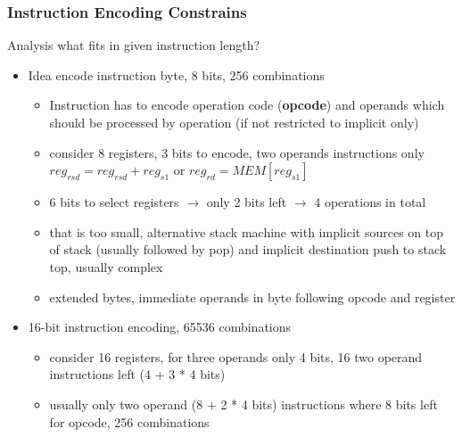 \documentclass{beamer}
\begin{document}
\begin{frame}
\frametitle{Instruction Encoding Constrains}

Analysis what fits in given instruction length?
\begin{itemize}
\item Idea encode instruction byte, 8 bits, 256 combinations
\begin{itemize}
\item Instruction has to encode operation code (\textbf{opcode}) and operands which should be processed by operation (if not restricted to implicit only)
\item consider 8 registers, 3 bits to encode, two operands instructions only \texttt{$reg_{rsd} = reg_{rsd} + reg_{s1}$} or \texttt{$reg_{rd} = MEM[reg_{s1}]$}
\item 6 bits to select registers $\to$ only 2 bits left $\to$ 4 operations in total
\item that is too small, alternative stack machine with implicit sources on top of stack (usually followed by pop) and implicit destination push to stack top, usually complex
\item extended bytes, immediate operands in byte following opcode and register
\end{itemize}
\item 16-bit instruction encoding, 65536 combinations
\begin{itemize}
\item consider 16 registers, for three operands only 4 bits, 16 two operand instructions left (4 + 3 * 4 bits)
\item usually only two operand (8 + 2 * 4 bits) instructions where 8 bits left for opcode, 256 combinations
\end{itemize}
\end{itemize}
\end{frame}
\end{document}
